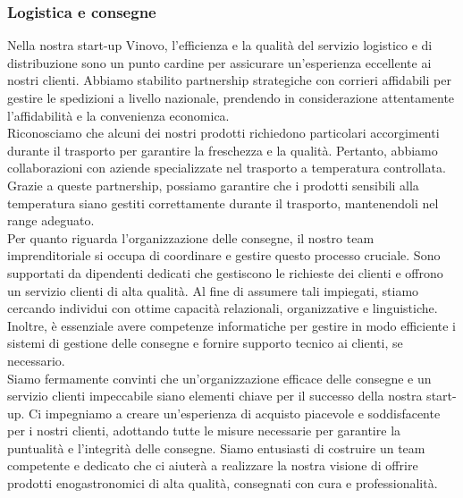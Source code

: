 \documentclass[12pt, a4paper]{article}
\newcommand{\meskip}{\medskip \\}
\begin{document}
\subsubsection{Logistica e consegne}
Nella nostra start-up Vinovo, l'efficienza e la qualità del servizio logistico e di distribuzione sono un punto cardine per assicurare un'esperienza eccellente ai nostri clienti. Abbiamo stabilito partnership strategiche con corrieri affidabili per gestire le spedizioni a livello nazionale, prendendo in considerazione attentamente l'affidabilità e la convenienza economica.\meskip
Riconosciamo che alcuni dei nostri prodotti richiedono particolari accorgimenti durante il trasporto per garantire la freschezza e la qualità. Pertanto, abbiamo collaborazioni con aziende specializzate nel trasporto a temperatura controllata. Grazie a queste partnership, possiamo garantire che i prodotti sensibili alla temperatura siano gestiti correttamente durante il trasporto, mantenendoli nel range adeguato.\meskip
Per quanto riguarda l'organizzazione delle consegne, il nostro team imprenditoriale si occupa di coordinare e gestire questo processo cruciale. Sono supportati da dipendenti dedicati che gestiscono le richieste dei clienti e offrono un servizio clienti di alta qualità. Al fine di assumere tali impiegati, stiamo cercando individui con ottime capacità relazionali, organizzative e linguistiche. Inoltre, è essenziale avere competenze informatiche per gestire in modo efficiente i sistemi di gestione delle consegne e fornire supporto tecnico ai clienti, se necessario.\meskip
Siamo fermamente convinti che un'organizzazione efficace delle consegne e un servizio clienti impeccabile siano elementi chiave per il successo della nostra start-up. Ci impegniamo a creare un'esperienza di acquisto piacevole e soddisfacente per i nostri clienti, adottando tutte le misure necessarie per garantire la puntualità e l'integrità delle consegne. Siamo entusiasti di costruire un team competente e dedicato che ci aiuterà a realizzare la nostra visione di offrire prodotti enogastronomici di alta qualità, consegnati con cura e professionalità.
\end{document}
